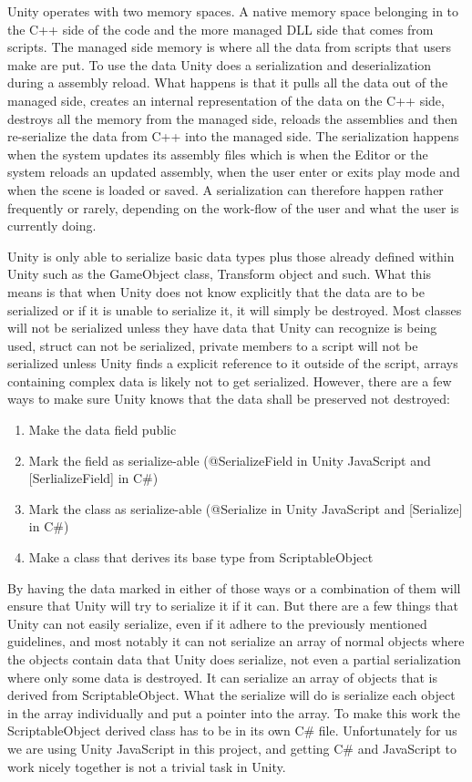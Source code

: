 Unity operates with two memory spaces. A native memory space belonging in to the C++ side of the code and the more managed DLL side that comes from scripts.
The managed side memory is where all the data from scripts that users make are put.
To use the data Unity does a serialization and deserialization during a assembly reload. What happens is that it pulls all the data out of the managed side, creates an internal representation of the data on the C++ side, destroys all the memory from the managed side, reloads the assemblies and then
re-serialize the data from C++ into the managed side.
The serialization happens when the system updates its assembly files which is when the Editor or the system reloads an updated assembly, when the user enter or exits play mode and when the scene is loaded or saved.
A serialization can therefore happen rather frequently or rarely, depending on the work-flow of the user and what the user is currently doing.

Unity is only able to serialize basic data types plus those already defined within Unity such as the GameObject class, Transform object and such.
What this means is that when Unity does not know explicitly that the data are to be serialized or if it is unable to serialize it, it will simply be destroyed. Most classes will not be serialized unless they have data that Unity can recognize is being used, struct can not be serialized, private members to a script will not be serialized unless Unity finds a explicit reference to it outside of the script, arrays containing complex data is likely not to get serialized.
However, there are a few ways to make sure Unity knows that the data shall be preserved not destroyed:

\begin{enumerate}
	\item Make the data field public
	\item Mark the field as serialize-able (@SerializeField in Unity JavaScript and [SerlializeField] in C\#)
	\item Mark the class as serialize-able (@Serialize in Unity JavaScript and [Serialize] in C\#)
	\item Make a class that derives its base type from ScriptableObject
\end {enumerate}

By having the data marked in either of those ways or a combination of them will ensure that Unity will try to serialize it if it can.
But there are a few things that Unity can not easily serialize, even if it adhere to the previously mentioned guidelines, and most notably it can not serialize an array of normal objects where the objects contain data that Unity does serialize, not even a partial serialization where only some data is destroyed.
It can serialize an array of objects that is derived from ScriptableObject. What the serialize will do is serialize each object in the
array individually and put a pointer into the array. To make this work the ScriptableObject derived class has to be in its own
C\# file.
Unfortunately for us we are using Unity JavaScript in this project, and getting C\# and JavaScript to work nicely
together is not a trivial task in Unity.

